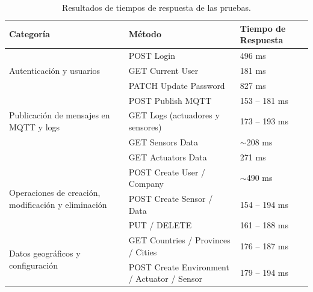 \begin{table}[H]
    \centering
    \caption[Resultados de tiempos de respuesta]{Resultados de tiempos de respuesta de las pruebas.}
    \begin{tabular}{p{5cm}p{5.1cm}p{2.4cm}}
        \toprule
        \textbf{Categoría}                                                     & \textbf{Método}                             & \textbf{Tiempo de Respuesta} \\
        \midrule
        \multirow{3}{5cm}{Autenticación y usuarios}                            & POST Login                                  & 496 ms                       \\
                                                                               & GET Current User                            & 181 ms                       \\
                                                                               & PATCH Update Password                       & 827 ms                       \\
        \hline
        \multirow{3}{5cm}{Publicación de mensajes en MQTT y logs}              & POST Publish MQTT                           & 153 – 181 ms                 \\
                                                                               & GET Logs (actuadores y sensores)            & 173 – 193 ms                 \\
        \hline
        \multirow{2}{5cm}{Consulta de datos de dispositivos}                   & GET Sensors Data                            & $\sim$208 ms                 \\
                                                                               & GET Actuators Data                          & 271 ms                       \\
        \hline
        \multirow{3}{5cm}{Operaciones de creación, modificación y eliminación} & POST Create User / Company                  & $\sim$490 ms                 \\
                                                                               & POST Create Sensor / Data                   & 154 – 194 ms                 \\
                                                                               & PUT / DELETE                                & 161 – 188 ms                 \\
        \hline
        \multirow{4}{5cm}{Datos geográficos y configuración}                   & GET Countries / Provinces / Cities          & 176 – 187 ms                 \\
                                                                               & POST Create Environment / Actuator / Sensor & 179 – 194 ms                 \\
        \bottomrule
    \end{tabular}
    \label{tab:tiempos_respuesta}
\end{table}

